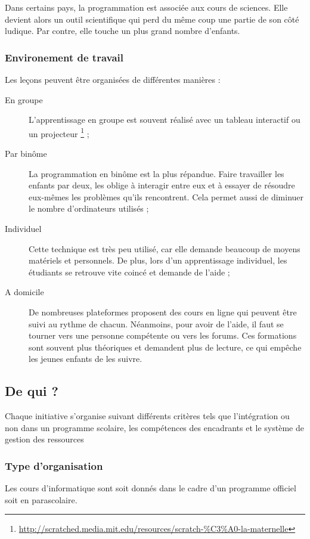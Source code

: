 Dans certains pays, la programmation est associée aux cours de sciences. Elle devient alors un outil scientifique qui perd du même coup une partie de son côté ludique. Par contre, elle touche un plus grand nombre d'enfants.\\

\subsubsection{Environement de travail}
\label{paire}
Les leçons peuvent être organisées de différentes manières :
\begin{description}
  \item[En groupe] L'apprentissage en groupe est souvent réalisé avec un tableau interactif ou un projecteur \footnote{\url{http://scratched.media.mit.edu/resources/scratch-\%C3\%A0-la-maternelle}} ;
  \item[Par binôme] La programmation en binôme est la plus répandue. Faire travailler les enfants par deux, les oblige à interagir entre eux et à essayer de résoudre eux-mêmes les problèmes qu'ils rencontrent. Cela permet aussi de diminuer le nombre d'ordinateurs utilisés ;
  \item[Individuel] Cette technique est très peu utilisé, car elle demande beaucoup de moyens matériels et personnels. De plus, lors d'un apprentissage individuel, les étudiants se retrouve vite coincé et demande de l'aide ;
  \item[A domicile] De nombreuses plateformes proposent des cours en ligne qui peuvent être suivi au rythme de chacun. Néanmoins, pour avoir de l'aide, il faut se tourner vers une personne compétente ou vers les forums. Ces formations sont souvent plus théoriques et demandent plus de lecture, ce qui empêche les jeunes enfants de les suivre.
\end{description}

\subsection{De qui ?}
Chaque initiative s'organise suivant différents critères tels que l'intégration ou non dans un programme scolaire, les compétences des encadrants et le système de gestion des ressources 

\subsubsection{Type d'organisation} 
Les cours d'informatique sont soit donnés dans le cadre d'un programme officiel soit en parascolaire.

